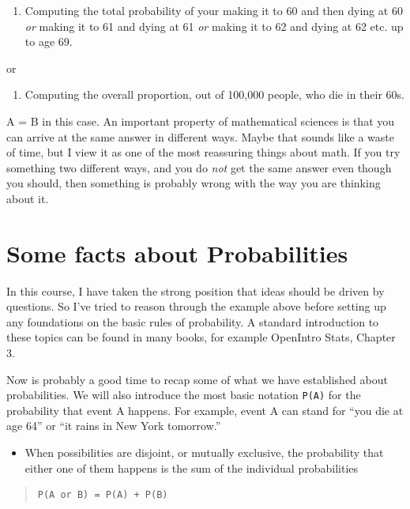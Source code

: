 \documentclass[openany]{book}
\providecommand{\tightlist}{%
  \setlength{\itemsep}{0pt}\setlength{\parskip}{0pt}}
\begin{document}
\begin{enumerate}
\def\labelenumi{\Alph{enumi})}
\tightlist
\item
  Computing the total probability of your making it to 60 and then dying at 60 \emph{or} making it to 61 and dying at 61 \emph{or} making it to 62 and dying at 62 etc. up to age 69.
\end{enumerate}

or

\begin{enumerate}
\def\labelenumi{\Alph{enumi})}
\setcounter{enumi}{1}
\tightlist
\item
  Computing the overall proportion, out of 100,000 people, who die in their 60s.
\end{enumerate}

A = B in this case. An important property of mathematical sciences is that you can arrive at the same answer in different ways. Maybe that sounds like a waste of time, but I view it as one of the most reassuring things about math. If you try something two different ways, and you do \emph{not} get the same answer even though you should, then something is probably wrong with the way you are thinking about it.

\hypertarget{somefacts}{%
\chapter{Some facts about Probabilities}\label{somefacts}}

In this course, I have taken the strong position that ideas should be driven by questions. So I've tried to reason through the example above before setting up any foundations on the basic rules of probability. A standard introduction to these topics can be found in many books, for example OpenIntro Stats, Chapter 3.

Now is probably a good time to recap some of what we have established about probabilities. We will also introduce the most basic notation \texttt{P(A)} for the probability that event A happens. For example, event A can stand for ``you die at age 64'' or ``it rains in New York tomorrow.''

\begin{itemize}
\tightlist
\item
  When possibilities are disjoint, or mutually exclusive, the probability that either one of them happens is the sum of the individual probabilities
\end{itemize}

\begin{quote}
\begin{verbatim}
P(A or B) = P(A) + P(B)
\end{verbatim}
\end{quote}
\end{document}
